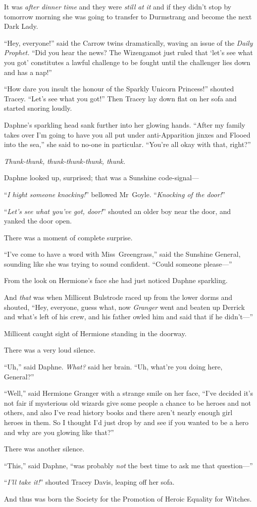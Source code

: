 It was \emph{after dinner time} and they were \emph{still at it} and if they didn’t stop by tomorrow morning she was going to transfer to Durmstrang and become the next Dark Lady.

“Hey, everyone!” said the Carrow twins dramatically, waving an issue of the \emph{Daily Prophet.}
“Did you hear the news? The Wizengamot just ruled that ‘let’s see what you got’ constitutes a lawful challenge to be fought until the challenger lies down and has a nap!”

“How dare you insult the honour of the Sparkly Unicorn Princess!” shouted Tracey.
“Let’s see what you got!” Then Tracey lay down flat on her sofa and started snoring loudly.

Daphne’s sparkling head sank further into her glowing hands.
“After my family takes over I’m going to have you all put under anti-Apparition jinxes and Flooed into the sea,” she said to no-one in particular.
“You’re all okay with that, right?”

\emph{Thunk-thunk, thunk-thunk-thunk, thunk.}

Daphne looked up, surprised; that was a Sunshine code-signal—

“\emph{I hight someone knocking!}” bellowed Mr~Goyle. “\emph{Knocking of the door!}”

“\emph{Let’s see what you’ve got, door!}” shouted an older boy near the door, and yanked the door open.

There was a moment of complete surprise.

“I’ve come to have a word with Miss~Greengrass,” said the Sunshine General, sounding like she was trying to sound confident.
“Could someone please—”

From the look on Hermione’s face she had just noticed Daphne sparkling.

And \emph{that} was when Millicent Bulstrode raced up from the lower dorms and shouted,
“Hey, everyone, guess what, now \emph{Granger} went and beaten up Derrick and what’s left of his crew, and his father owled him and said that if he didn’t—”

Millicent caught sight of Hermione standing in the doorway.

There was a very loud silence.

“Uh,” said Daphne. \emph{What?} said her brain.
“Uh, what’re you doing here, General?”

“Well,” said Hermione Granger with a strange smile on her face,
“I’ve decided it’s not fair if mysterious old wizards give some people a chance to be heroes and not others, and also I’ve read history books and there aren’t nearly enough girl heroes in them. So I thought I’d just drop by and see if you wanted to be a hero and why are you glowing like that?”

There was another silence.

“This,” said Daphne, “was probably \emph{not} the best time to ask me that question—”

“\emph{I’ll take it!}” shouted Tracey Davis, leaping off her sofa.

\later

And thus was born the Society for the Promotion of Heroic Equality for Witches.

